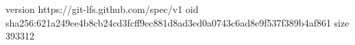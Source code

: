 version https://git-lfs.github.com/spec/v1
oid sha256:621a249ee4b8cb24cd3fcff9ec881d8ad3ed0a0743c6ad8e9f537f389b4af861
size 393312
